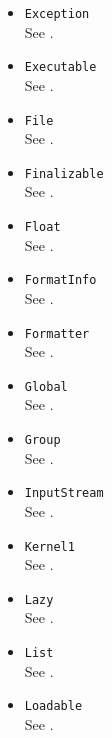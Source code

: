 \begin{itemize}
\item \lstinline|Exception|\\
  See .

\item \lstinline|Executable|\\
  See .

\item \lstinline|File|\\
  See .

\item \lstinline|Finalizable|\\
  See .

\item \lstinline|Float|\\
  See .

\item \lstinline|FormatInfo|\\
  See .

\item \lstinline|Formatter|\\
  See .

\item \lstinline|Global|\\
  See .

\item \lstinline|Group|\\
  See .

\item \lstinline|InputStream|\\
  See .


\item \lstinline|Kernel1|\\
  See .

\item \lstinline|Lazy|\\
  See .

\item \lstinline|List|\\
  See .

\item \lstinline|Loadable|\\
  See .


\end{itemize}
